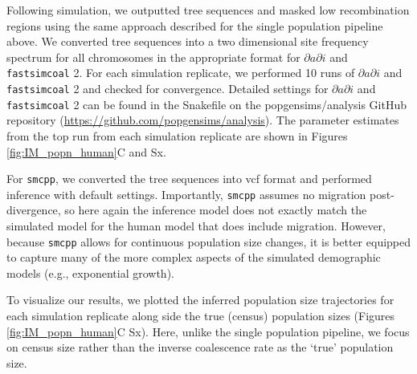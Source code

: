 \documentclass[12pt,halfline,a4paper]{ouparticle}
\newcommand{\dadi}{$\partial a \partial i$\xspace}
\newcommand{\smcpp}{\texttt{smcpp}\xspace}
\newcommand{\fastsimcoal}{\texttt{fastsimcoal}\xspace}
\begin{document}
Following simulation, we outputted tree sequences and masked low recombination
regions using the same approach described for the single population pipeline above. We
converted tree sequences into a two dimensional site frequency spectrum for all
chromosomes in the appropriate format for \dadi and \fastsimcoal2. For each simulation
replicate, we performed 10 runs of \dadi and \fastsimcoal2 and checked for convergence.
Detailed settings for \dadi and \fastsimcoal2 can be found in the Snakefile
on the popgensims/analysis GitHub repository (\url{https://github.com/popgensims/analysis}).
The parameter estimates from the top run from each simulation replicate
are shown in Figures \ref{fig:IM_popn_human}C and Sx.

For \smcpp , we converted the tree sequences into vcf format and performed inference
with default settings. Importantly, \smcpp assumes no migration post-divergence, so
here again the inference model does not exactly match the simulated model for the
human model that does include migration. However, because \smcpp allows
for continuous population size changes, it is better equipped to capture many of the
more complex aspects of the simulated demographic models (e.g., exponential growth).

To visualize our results, we plotted the inferred population size trajectories
for each simulation replicate along side the true (census) population sizes
(Figures \ref{fig:IM_popn_human}C Sx). Here, unlike the single population pipeline,
we focus on census size rather than the inverse coalescence rate as the `true' population size.
\end{document}
